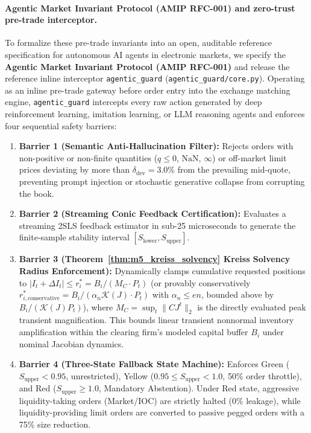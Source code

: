 \documentclass[10pt,twocolumn,letterpaper]{article}
\theoremstyle{definition}
\theoremstyle{remark}
\begin{document}
\paragraph{Agentic Market Invariant Protocol (AMIP RFC-001) and zero-trust pre-trade interceptor.}
To formalize these pre-trade invariants into an open, auditable reference specification for autonomous AI agents in electronic markets, we specify the \textbf{Agentic Market Invariant Protocol (AMIP RFC-001)} and release the reference inline interceptor \texttt{agentic\_guard} (\texttt{agentic\_guard/core.py}). Operating as an inline pre-trade gateway before order entry into the exchange matching engine, \texttt{agentic\_guard} intercepts every raw action generated by deep reinforcement learning, imitation learning, or LLM reasoning agents and enforces four sequential safety barriers:
\begin{enumerate}
    \item \textbf{Barrier 1 (Semantic Anti-Hallucination Filter):} Rejects orders with non-positive or non-finite quantities ($q \le 0$, $\text{NaN}$, $\infty$) or off-market limit prices deviating by more than $\delta_{\mathrm{dev}} = 3.0\%$ from the prevailing mid-quote, preventing prompt injection or stochastic generative collapse from corrupting the book.
    \item \textbf{Barrier 2 (Streaming Conic Feedback Certification):} Evaluates a streaming 2SLS feedback estimator in sub-25 microseconds to generate the finite-sample stability interval $[S_{\mathrm{lower}}, S_{\mathrm{upper}}]$.
    \item \textbf{Barrier 3 (Theorem~\ref{thm:m5_kreiss_solvency} Kreiss Solvency Radius Enforcement):} Dynamically clamps cumulative requested positions to $|I_t + \Delta I_t| \le r_i^* = B_i / (M_C \cdot P_t)$ (or provably conservatively $r_{i, \text{conservative}}^* = B_i / (\alpha_n \mathcal{K}(J) \cdot P_t)$ with $\alpha_n \le en$, bounded above by $B_i / (\mathcal{K}(J) P_t)$), where $M_C = \sup_t \|CJ^t\|_2$ is the directly evaluated peak transient magnification. This bounds linear transient nonnormal inventory amplification within the clearing firm's modeled capital buffer $B_i$ under nominal Jacobian dynamics.
    \item \textbf{Barrier 4 (Three-State Fallback State Machine):} Enforces Green ($S_{\mathrm{upper}} < 0.95$, unrestricted), Yellow ($0.95 \le S_{\mathrm{upper}} < 1.0$, 50\% order throttle), and Red ($S_{\mathrm{upper}} \ge 1.0$, Mandatory Abstention). Under Red state, aggressive liquidity-taking orders (Market/IOC) are strictly halted (0\% leakage), while liquidity-providing limit orders are converted to passive pegged orders with a 75\% size reduction.
\end{enumerate}
\end{document}
